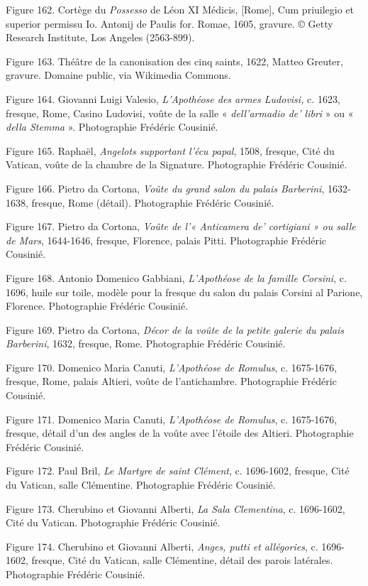 \documentclass[12pt,twoside,openany]{book}
\begin{document}
Figure 162. Cortège du \textit{Possesso} de Léon XI Médicis, [Rome], Cum priuilegio et superior permissu Io. Antonij de Paulis for. Romae, 1605, gravure. © Getty Research Institute, Los Angeles (2563-899).

Figure 163. Théâtre de la canonisation des cinq saints, 1622, Matteo Greuter, gravure. Domaine public, via Wikimedia Commons.

Figure 164. Giovanni Luigi Valesio, \textit{L’Apothéose des armes Ludovisi, }c. 1623, fresque, Rome, Casino Ludovisi, voûte de la salle « \textit{dell’armadio de’ libri} » ou « \textit{della Stemma} ». Photographie Frédéric Cousinié.

Figure 165. Raphaël, \textit{Angelots supportant l’écu papal}, 1508, fresque, Cité du Vatican, voûte de la chambre de la Signature. Photographie Frédéric Cousinié.

Figure 166. Pietro da Cortona, \textit{Voûte du grand salon du palais Barberini}, 1632-1638, fresque, Rome (détail). Photographie Frédéric Cousinié.

Figure 167. Pietro da Cortona, \textit{Voûte de l’« Anticamera de’ cortigiani » ou salle de Mars}, 1644-1646, fresque, Florence, palais Pitti. Photographie Frédéric Cousinié.

Figure 168. Antonio Domenico Gabbiani, \textit{L’Apothéose de la famille Corsini}, c. 1696, huile sur toile, modèle pour la fresque du salon du palais Corsini al Parione, Florence. Photographie Frédéric Cousinié.

Figure 169. Pietro da Cortona, \textit{Décor de la voûte de la petite galerie du palais Barberini}, 1632, fresque, Rome. Photographie Frédéric Cousinié.

Figure 170. Domenico Maria Canuti, \textit{L’Apothéose de Romulus}, c. 1675-1676, fresque, Rome, palais Altieri, voûte de l’antichambre. Photographie Frédéric Cousinié.

Figure 171. Domenico Maria Canuti, \textit{L’Apothéose de Romulus}, c. 1675-1676, fresque, détail d’un des angles de la voûte avec l’étoile des Altieri. Photographie Frédéric Cousinié.

Figure 172. Paul Bril, \textit{Le Martyre de saint Clément}, c. 1696-1602, fresque, Cité du Vatican, salle Clémentine. Photographie Frédéric Cousinié.

Figure 173. Cherubino et Giovanni Alberti, \textit{La Sala Clementina}, c. 1696-1602, Cité du Vatican. Photographie Frédéric Cousinié.

Figure 174. Cherubino et Giovanni Alberti, \textit{Anges, putti et allégories}, c. 1696-1602, fresque, Cité du Vatican, salle Clémentine, détail des parois latérales. Photographie Frédéric Cousinié.
\end{document}
